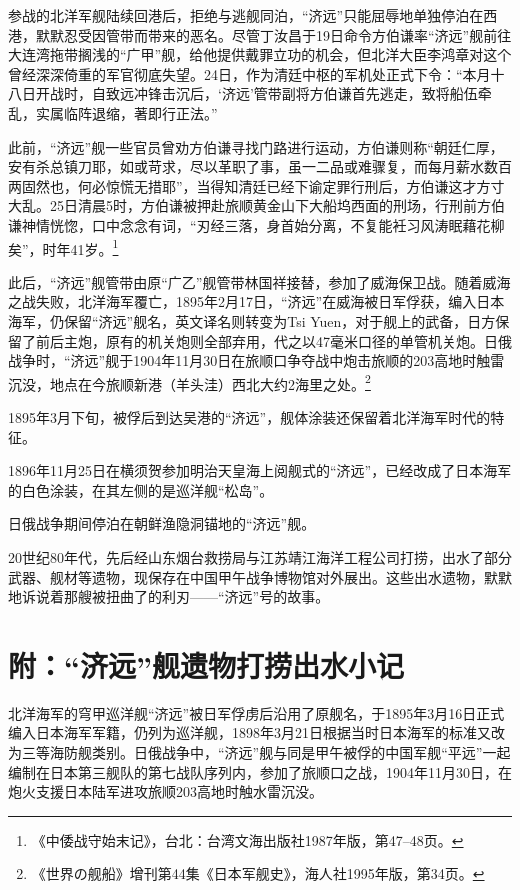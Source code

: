 \documentclass[12pt,UTF8]{ctexbook}
\begin{document}
参战的北洋军舰陆续回港后，拒绝与逃舰同泊，“济远”只能屈辱地单独停泊在西港，默默忍受因管带而带来的恶名。尽管丁汝昌于19日命令方伯谦率“济远”舰前往大连湾拖带搁浅的“广甲”舰，给他提供戴罪立功的机会，但北洋大臣李鸿章对这个曾经深深倚重的军官彻底失望。24日，作为清廷中枢的军机处正式下令：“本月十八日开战时，自致远冲锋击沉后，‘济远’管带副将方伯谦首先逃走，致将船伍牵乱，实属临阵退缩，著即行正法。”

此前，“济远”舰一些官员曾劝方伯谦寻找门路进行运动，方伯谦则称“朝廷仁厚，安有杀总镇刀耶，如或苛求，尽以革职了事，虽一二品或难骤复，而每月薪水数百两固然也，何必惊慌无措耶”，当得知清廷已经下谕定罪行刑后，方伯谦这才方寸大乱。25日清晨5时，方伯谦被押赴旅顺黄金山下大船坞西面的刑场，行刑前方伯谦神情恍惚，口中念念有词，“刃经三落，身首始分离，不复能衽习风涛眠藉花柳矣”，时年41岁。\footnote{《中倭战守始末记》，台北：台湾文海出版社1987年版，第47--48页。}

此后，“济远”舰管带由原“广乙”舰管带林国祥接替，参加了威海保卫战。随着威海之战失败，北洋海军覆亡，1895年2月17日，“济远”在威海被日军俘获，编入日本海军，仍保留“济远”舰名，英文译名则转变为Tsi Yuen，对于舰上的武备，日方保留了前后主炮，原有的机关炮则全部弃用，代之以47毫米口径的单管机关炮。日俄战争时，“济远”舰于1904年11月30日在旅顺口争夺战中炮击旅顺的203高地时触雷沉没，地点在今旅顺新港（羊头洼）西北大约2海里之处。\footnote{《世界の舰船》增刊第44集《日本军舰史》，海人社1995年版，第34页。}

1895年3月下旬，被俘后到达吴港的“济远”，舰体涂装还保留着北洋海军时代的特征。

1896年11月25日在横须贺参加明治天皇海上阅舰式的“济远”，已经改成了日本海军的白色涂装，在其左侧的是巡洋舰“松岛”。

日俄战争期间停泊在朝鲜渔隐洞锚地的“济远”舰。

20世纪80年代，先后经山东烟台救捞局与江苏靖江海洋工程公司打捞，出水了部分武器、舰材等遗物，现保存在中国甲午战争博物馆对外展出。这些出水遗物，默默地诉说着那艘被扭曲了的利刃——“济远”号的故事。

\section{附：“济远”舰遗物打捞出水小记}

北洋海军的穹甲巡洋舰“济远”被日军俘虏后沿用了原舰名，于1895年3月16日正式编入日本海军军籍，仍列为巡洋舰，1898年3月21日根据当时日本海军的标准又改为三等海防舰类别。日俄战争中，“济远”舰与同是甲午被俘的中国军舰“平远”一起编制在日本第三舰队的第七战队序列内，参加了旅顺口之战，1904年11月30日，在炮火支援日本陆军进攻旅顺203高地时触水雷沉没。
\end{document}
